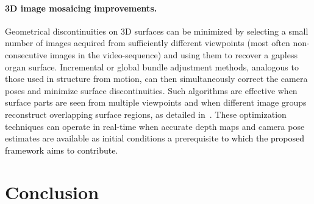 \documentclass[a4paper,fleqn]{cas-dc}
\begin{document}
\paragraph{3D image mosaicing improvements.}

Geometrical discontinuities on 3D surfaces can be minimized by selecting a small number of images acquired from sufficiently different viewpoints (most often non-consecutive images in the video-sequence) and using them to recover a gapless organ surface. Incremental or global bundle adjustment methods, analogous to those used in structure from motion, can then simultaneously correct the camera poses and minimize surface discontinuities. Such algorithms are effective when surface parts are seen from multiple viewpoints and when different image groups reconstruct overlapping surface regions, as detailed in~\citep{Phan_PR_2020}. 
These optimization techniques can operate in real-time when accurate depth maps and camera pose estimates are available as initial conditions a prerequisite \textcolor{black}{to which the proposed framework aims to contribute.}
%
\section{Conclusion\label{sec:conclusions}}
\end{document}
